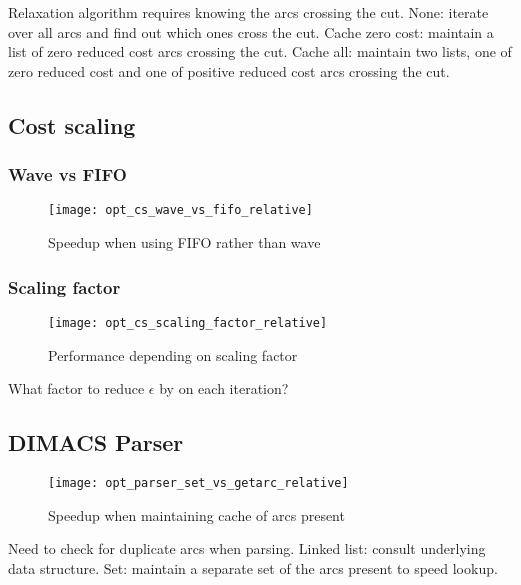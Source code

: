 Relaxation algorithm requires knowing the arcs crossing the cut. None: iterate over all arcs and find out which ones cross the cut. Cache zero cost: maintain a list of zero reduced cost arcs crossing the cut. Cache all: maintain two lists, one of zero reduced cost and one of positive reduced cost arcs crossing the cut.

\subsection{Cost scaling}

\subsubsection{Wave vs FIFO}

\begin{figure}
    \centering
    \texttt{[image: opt\_cs\_wave\_vs\_fifo\_relative]}
    \caption{Speedup when using FIFO rather than wave}
    \label{fig:opt-cs-wave-vs-fifo}
\end{figure}


\subsubsection{Scaling factor}

\begin{figure}
    \centering
    \texttt{[image: opt\_cs\_scaling\_factor\_relative]}
    \caption{Performance depending on scaling factor}
    \label{fig:opt-cs-scaling-factor}
\end{figure}

What factor to reduce $\epsilon$ by on each iteration?

\subsection{DIMACS Parser}

\begin{figure}
    \centering
    \texttt{[image: opt\_parser\_set\_vs\_getarc\_relative]}
    \caption{Speedup when maintaining cache of arcs present}
    \label{fig:opt-dimacs-parser}
\end{figure}

Need to check for duplicate arcs when parsing. Linked list: consult underlying data structure. Set: maintain a separate set of the arcs present to speed lookup.

